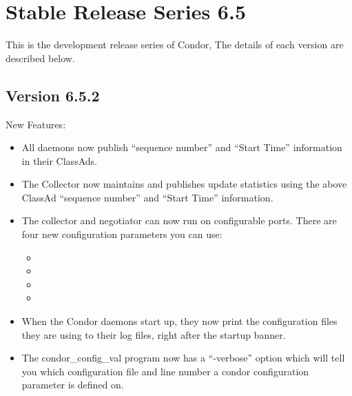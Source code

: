 \section{\label{sec:History-6-5}Stable Release Series 6.5}

This is the development release series of Condor,
The details of each version are described below.

\subsection{\label{sec:New-6-5-2}Version 6.5.2}

\noindent New Features:
\begin{itemize}

\item All daemons now publish ``sequence number'' and ``Start Time'' information in their
ClassAds.

\item The Collector now maintains and publishes update statistics
using the above ClassAd ``sequence number'' and ``Start Time'' information.

\item The collector and negotiator can now run on configurable
 ports. There are four new configuration parameters you can use:

  \begin{itemize}
  \item {}
  \item {}
  \item {}
  \item {}
  \end{itemize}

\item When the Condor daemons start up, they now print the
  configuration files they are using to their log files, right after
  the startup banner.

\item The condor\_config\_val program now has a ``-verbose'' option
  which will tell you which configuration file and line number a
  condor configuration parameter is defined on.

\end{itemize}

